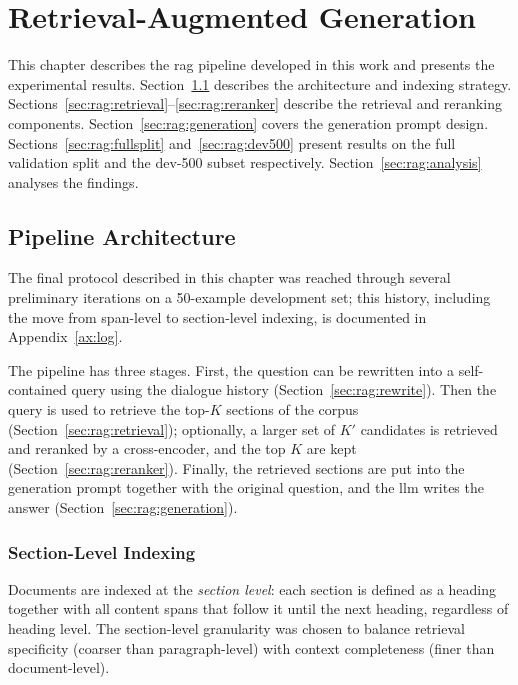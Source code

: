 
\chapter{Retrieval-Augmented Generation}\label{ch:rag}

This chapter describes the \gls{rag} pipeline developed in this work and presents
the experimental results. Section~\ref{sec:rag:arch} describes the architecture
and indexing strategy. Sections~\ref{sec:rag:retrieval}--\ref{sec:rag:reranker}
describe the retrieval and reranking components. Section~\ref{sec:rag:generation}
covers the generation prompt design. Sections~\ref{sec:rag:fullsplit}
and~\ref{sec:rag:dev500} present results on the full validation split and the
dev-500 subset respectively. Section~\ref{sec:rag:analysis} analyses the findings.


\section{Pipeline Architecture}\label{sec:rag:arch}

The final protocol described in this chapter was reached through several
preliminary iterations on a 50-example development set; this history, including
the move from span-level to section-level indexing, is documented in
Appendix~\ref{ax:log}.

The pipeline has three stages. First, the question can be rewritten into a
self-contained query using the dialogue history (Section~\ref{sec:rag:rewrite}). Then
the query is used to retrieve the top-$K$ sections of the corpus
(Section~\ref{sec:rag:retrieval}); optionally, a larger set of $K'$ candidates is
retrieved and reranked by a cross-encoder, and the top $K$ are kept
(Section~\ref{sec:rag:reranker}). Finally, the retrieved sections are put into the
generation prompt together with the original question, and the \gls{llm} writes the
answer (Section~\ref{sec:rag:generation}).

\subsection{Section-Level Indexing}

Documents are indexed at the \emph{section level}: each section is defined as a
heading together with all content spans that follow it until the next heading,
regardless of heading level. The section-level granularity was chosen to balance
retrieval specificity (coarser than paragraph-level) with context completeness
(finer than document-level).

